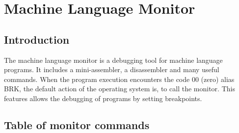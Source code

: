 \chapter{Machine Language Monitor}

\section{Introduction}

The machine language monitor is a debugging tool for machine language
programs. It includes a mini-assembler, a disassembler and many useful commands.
When the program execution encounters the code 00 (zero) alias BRK,
the default action of the operating system is, to call the monitor.
This features allows the debugging of programs by setting breakpoints.

\section{Table of monitor commands}

